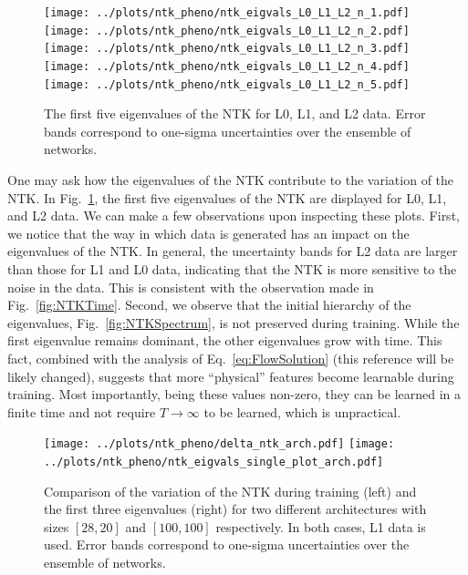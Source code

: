 \begin{figure}[ht!]
  \centering
  \texttt{[image: ../plots/ntk\_pheno/ntk\_eigvals\_L0\_L1\_L2\_n\_1.pdf]}
  \texttt{[image: ../plots/ntk\_pheno/ntk\_eigvals\_L0\_L1\_L2\_n\_2.pdf]}
  \texttt{[image: ../plots/ntk\_pheno/ntk\_eigvals\_L0\_L1\_L2\_n\_3.pdf]}
  \texttt{[image: ../plots/ntk\_pheno/ntk\_eigvals\_L0\_L1\_L2\_n\_4.pdf]}
  \texttt{[image: ../plots/ntk\_pheno/ntk\_eigvals\_L0\_L1\_L2\_n\_5.pdf]}
  \vspace{0.5cm}
  \caption{The first five eigenvalues of the NTK for L0, L1, and L2 data. Error
  bands correspond to one-sigma uncertainties over the ensemble of networks.}
  \label{fig:EigvalsComparison}
\end{figure}
One may ask how the eigenvalues of the NTK contribute to the variation of the
NTK. In Fig.~\ref{fig:EigvalsComparison}, the first five eigenvalues of the NTK
are displayed for L0, L1, and L2 data. We can make a few observations upon
inspecting these plots. First, we notice that the way in which data is generated
has an impact on the eigenvalues of the NTK. In general, the uncertainty bands
for L2 data are larger than those for L1 and L0 data, indicating that the NTK is
more sensitive to the noise in the data. This is consistent with the observation
made in Fig.~\ref{fig:NTKTime}. Second, we observe that the initial hierarchy of
the eigenvalues, Fig.~\ref{fig:NTKSpectrum}, is not preserved during training.
While the first eigenvalue remains dominant, the other eigenvalues grow with
time. This fact, combined with the analysis of Eq.~\eqref{eq:FlowSolution}
\ac{(this reference will be likely changed)}, suggests that more ``physical''
features become learnable during training. Most importantly, being these values
non-zero, they can be learned in a finite time and not require
$T\rightarrow\infty$ to be learned, which is unpractical.

\begin{figure}[ht!]
  \centering
  \texttt{[image: ../plots/ntk\_pheno/delta\_ntk\_arch.pdf]}
  \texttt{[image: ../plots/ntk\_pheno/ntk\_eigvals\_single\_plot\_arch.pdf]}
  \caption{Comparison of the variation of the NTK during training (left) and the
  first three eigenvalues (right) for two different architectures with sizes
  $[28,20]$ and $[100,100]$ respectively. In both cases, L1 data is used. Error
  bands correspond to one-sigma uncertainties over the ensemble of networks.}
  \label{fig:NTKTimeDiffArch}
\end{figure}

